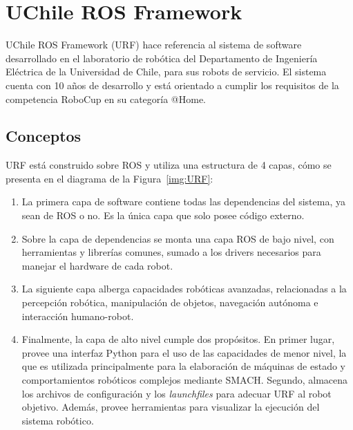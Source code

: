 
\section{UChile ROS Framework}\label{sec:URF}

UChile ROS Framework (URF) hace referencia al sistema de software desarrollado en el laboratorio de robótica del Departamento de Ingeniería Eléctrica de la Universidad de Chile, para sus robots de servicio. El sistema cuenta con 10 años de desarrollo y está orientado a cumplir los requisitos de la competencia RoboCup en su categoría @Home.

\subsection{Conceptos}

URF está construido sobre ROS y utiliza una estructura de 4 capas, cómo se presenta en el diagrama de la Figura~\ref{img:URF}:
\begin{enumerate}
\item La primera capa de software contiene todas las dependencias del sistema, ya sean de ROS o no. Es la única capa que solo posee código externo.
\item Sobre la capa de dependencias se monta una capa ROS de bajo nivel, con herramientas y librerías comunes, sumado a los drivers necesarios para manejar el hardware de cada robot.
\item La siguiente capa alberga capacidades robóticas avanzadas, relacionadas a la  percepción robótica, manipulación de objetos, navegación autónoma e interacción humano-robot.
\item Finalmente, la capa de alto nivel cumple dos propósitos. En primer lugar, provee una interfaz Python para el uso de las capacidades de menor nivel, la que es utilizada principalmente para la elaboración de máquinas de estado y comportamientos robóticos complejos mediante SMACH. Segundo, almacena los archivos de configuración y los \textit{launchfiles} para adecuar URF al robot objetivo. Además, provee herramientas para visualizar la ejecución del sistema robótico.
\end{enumerate}

